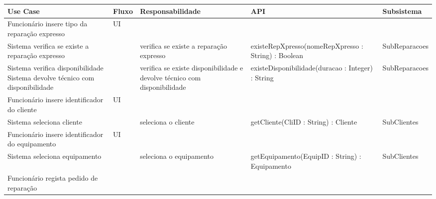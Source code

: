 \documentclass[../relatorio.tex]{subfiles}
\begin{document}
\begin{landscape}
    \begin{table}[!h]
        \centering
        \begin{tabular}{|p{5cm}|p{1cm}|p{4cm}|p{6cm}|p{3cm}|}
            \hline
            \rowcolor{gray!20!white}
            Use Case & Fluxo                                            & Responsabilidade & API & Subsistema \\
            \hline
            \rowcolor{yellow}
            Funcionário insere tipo da reparação expresso
                     & UI
                     & 
                     & 
                     & 
            \\
            \hline
            Sistema verifica se existe a reparação expresso
                     & 
                     & verifica se existe a reparação expresso
                     & existeRepXpresso(nomeRepXpresso : String) : Boolean
                     & SubReparacoes
            \\
            \hline
            Sistema verifica disponibilidade
            Sistema devolve técnico com disponibilidade
                     & 
                     & verifica se existe disponibilidade e devolve técnico com disponibilidade
                     & existeDisponibilidade(duracao : Integer) : String
                     & SubReparacoes
            \\
            \hline
            \rowcolor{yellow}
            Funcionário insere identificador do cliente
                     & UI
                     & 
                     & 
                     & 
            \\
            \hline
            Sistema seleciona cliente
                     & 
                     & seleciona o cliente
                     & getCliente(CliID : String) : Cliente
                     & SubClientes
            \\
            \hline
            \rowcolor{yellow}
            Funcionário insere identificador do equipamento
                     & UI
                     & 
                     & 
                     & 
            \\
            Sistema seleciona equipamento
                     & 
                     & seleciona o equipamento
                     & getEquipamento(EquipID : String) : Equipamento
                     & SubClientes
            \\
            \hline
            \rowcolor{yellow}
            Funcionário regista pedido de reparação

\end{tabular}
\end{table}
\end{landscape}
\end{document}

